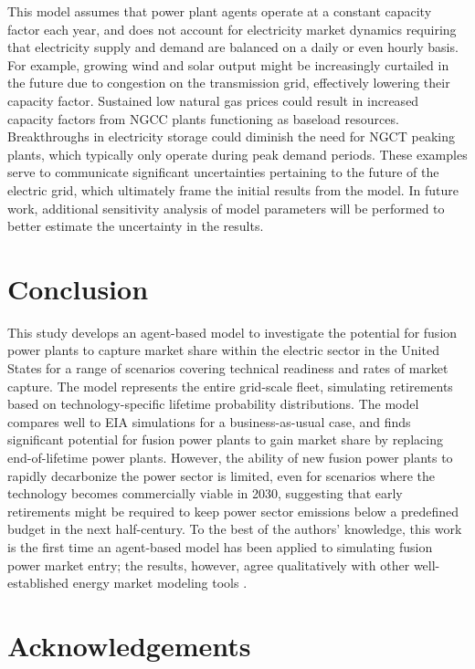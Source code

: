 \documentclass[review]{elsarticle}
\begin{document}
This model assumes that power plant agents operate at a constant capacity factor each year, and does not account for electricity market dynamics requiring that electricity supply and demand are balanced on a daily or even hourly basis. For example, growing wind and solar output might be increasingly curtailed in the future due to congestion on the transmission grid, effectively lowering their capacity factor. Sustained low natural gas prices could result in increased capacity factors from NGCC plants functioning as baseload resources. Breakthroughs in electricity storage could diminish the need for NGCT peaking plants, which typically only operate during peak demand periods. These examples serve to communicate significant uncertainties pertaining to the future of the electric grid, which ultimately frame the initial results from the model. In future work, additional sensitivity analysis of model parameters will be performed to better estimate the uncertainty in the results.

\section{Conclusion}

This study develops an agent-based model to investigate the potential for fusion power plants to capture market share within the electric sector in the United States for a range of scenarios covering technical readiness and rates of market capture. The model represents the entire grid-scale fleet, simulating retirements based on technology-specific lifetime probability distributions. The model compares well to EIA simulations for a business-as-usual case, and finds significant potential for fusion power plants to gain market share by replacing end-of-lifetime power plants. However, the ability of new fusion power plants to rapidly decarbonize the power sector is limited, even for scenarios where the technology becomes commercially viable in 2030, suggesting that early retirements might be required to keep power sector emissions below a predefined budget in the next half-century. To the best of the authors' knowledge, this work is the first time an agent-based model has been applied to simulating fusion power market entry; the results, however, agree qualitatively with other well-established energy market modeling tools \citep{ACFD}.

\section{Acknowledgements}
\end{document}
